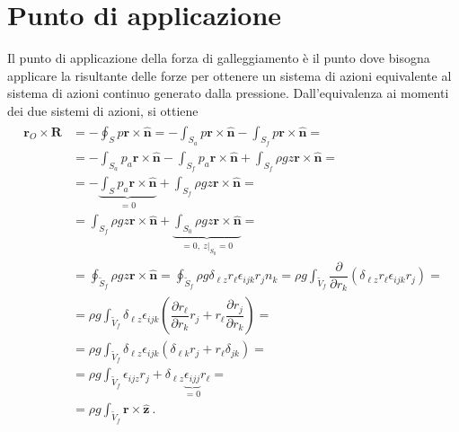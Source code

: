 \documentclass[letterpaper,10pt,italian]{jupyterBook}
\begin{document}
\section{Punto di applicazione}
\label{\detokenize{polimi/fluidmechanics-ita/template/capitoli/01_statica/02teoria:punto-di-applicazione}}
\sphinxAtStartPar
Il punto di applicazione della forza di galleggiamento è il punto dove
bisogna applicare la risultante delle forze per ottenere un sistema di
azioni equivalente al sistema di azioni continuo generato dalla
pressione. Dall’equivalenza ai momenti dei due sistemi di azioni, si
ottiene
\begin{equation*}
\begin{split}\begin{aligned}
\mathbf{r}_O \times \mathbf{R} & = - \oint_{S} p \mathbf{r} \times \mathbf{\hat{n}} = 
    - \int_{S_a} p \mathbf{r} \times \mathbf{\hat{n}}
    - \int_{S_f} p \mathbf{r} \times \mathbf{\hat{n}} = \\
& = - \int_{S_a} p_a \mathbf{r} \times \mathbf{\hat{n}}
    - \int_{S_f} p_a \mathbf{r} \times \mathbf{\hat{n}} 
    + \int_{S_f} \rho g z \mathbf{r} \times \mathbf{\hat{n}} = \\
& = - \underbrace{\int_{S} p_a \mathbf{r} \times \mathbf{\hat{n}}}_{=0} + 
      \int_{S_f} \rho g z \mathbf{r} \times \mathbf{\hat{n}} = \\
& =   \int_{S_f} \rho g z \mathbf{r} \times \mathbf{\hat{n}} + 
      \underbrace{\int_{S_0} \rho g z \mathbf{r} \times \mathbf{\hat{n}}}_{=0, \ z|_{S_0} = 0} =\\
& =  \oint_{\tilde{S}_f} \rho g z \mathbf{r} \times \mathbf{\hat{n}} = 
     \oint_{\tilde{S}_f} \rho g \delta_{\ell z} r_{\ell} \epsilon_{ijk} r_j n_k = 
     \rho g \int_{\tilde{V}_f} \dfrac{\partial}{\partial r_k}( \delta_{\ell z} r_{\ell} \epsilon_{ijk} r_j ) = \\
    & = \rho g \int_{\tilde{V}_f} \delta_{\ell z} \epsilon_{ijk}\left(  \dfrac{\partial r_{\ell}}{\partial r_k} r_j + r_{\ell} \dfrac{\partial r_j}{\partial r_k} \right) = \\ 
    & = \rho g \int_{\tilde{V}_f} \delta_{\ell z} \epsilon_{ijk}\left( \delta_{\ell k}r_j + r_{\ell} \delta_{jk} \right) = \\
    & = \rho g \int_{\tilde{V}_f} \epsilon_{ijz} r_j + \delta_{\ell z} \underbrace{\epsilon_{ijj}}_{ = 0} r_{\ell} = \\
    & = \rho g \int_{\tilde{V}_f}  \mathbf{r} \times \mathbf{\hat{z}} \ .
\end{aligned}\end{split}
\end{equation*}
\end{document}
